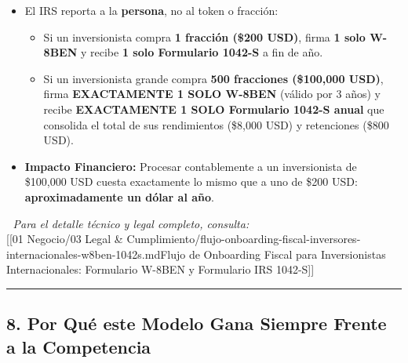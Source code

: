 \documentclass[
]{article}
\providecommand{\tightlist}{%
  \setlength{\itemsep}{0pt}\setlength{\parskip}{0pt}}
\renewenvironment{quote}{%
  \vspace{0.4em}
  \begin{tcolorbox}[
    colback=bridsLight,
    colframe=bridsBlue,
    arc=2mm,
    boxrule=1.2pt,
    left=10pt,
    right=10pt,
    top=8pt,
    bottom=8pt,
    before skip=6pt,
    after skip=8pt
  ]%
}{%
  \end{tcolorbox}%
}
\begin{document}
\begin{itemize}
\tightlist
\item
  El IRS reporta a la \textbf{persona}, no al token o fracción:

  \begin{itemize}
  \tightlist
  \item
    Si un inversionista compra \textbf{1 fracción (\$200 USD)}, firma
    \textbf{1 solo W-8BEN} y recibe \textbf{1 solo Formulario 1042-S} a
    fin de año.
  \item
    Si un inversionista grande compra \textbf{500 fracciones (\$100,000
    USD)}, firma \textbf{EXACTAMENTE 1 SOLO W-8BEN} (válido por 3 años)
    y recibe \textbf{EXACTAMENTE 1 SOLO Formulario 1042-S anual} que
    consolida el total de sus rendimientos (\$8,000 USD) y retenciones
    (\$800 USD).
  \end{itemize}
\item
  \textbf{Impacto Financiero:} Procesar contablemente a un inversionista
  de \$100,000 USD cuesta exactamente lo mismo que a uno de \$200 USD:
  \textbf{aproximadamente un dólar al año}.
\end{itemize}

\begin{quote}
📄 \emph{Para el detalle técnico y legal completo, consulta:}\\
{[}{[}01 Negocio/03 Legal \&
Cumplimiento/flujo-onboarding-fiscal-inversores-internacionales-w8ben-1042s.md\textbar Flujo
de Onboarding Fiscal para Inversionistas Internacionales: Formulario
W-8BEN y Formulario IRS 1042-S{]}{]}
\end{quote}

\begin{center}\rule{0.5\linewidth}{0.5pt}\end{center}

\subsection{8. Por Qué este Modelo Gana Siempre Frente a la
Competencia}\label{por-quuxe9-este-modelo-gana-siempre-frente-a-la-competencia}
\end{document}
